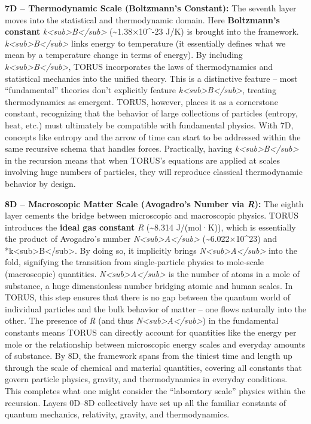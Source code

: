 \documentclass[
]{article}
\begin{document}
\textbf{7D -- Thermodynamic Scale (Boltzmann's Constant):} The seventh
layer moves into the statistical and thermodynamic domain. Here
\textbf{Boltzmann's constant}
\emph{k\textless sub\textgreater B\textless/sub\textgreater{}}
(\textasciitilde1.38×10\^{}-23 J/K) is brought into the framework.
\emph{k\textless sub\textgreater B\textless/sub\textgreater{}} links
energy to temperature (it essentially defines what we mean by a
temperature change in terms of energy). By including
\emph{k\textless sub\textgreater B\textless/sub\textgreater{}}, TORUS
incorporates the laws of thermodynamics and statistical mechanics into
the unified theory. This is a distinctive feature -- most
``fundamental'' theories don't explicitly feature
\emph{k\textless sub\textgreater B\textless/sub\textgreater{}}, treating
thermodynamics as emergent. TORUS, however, places it as a cornerstone
constant, recognizing that the behavior of large collections of
particles (entropy, heat, etc.) must ultimately be compatible with
fundamental physics. With 7D, concepts like entropy and the arrow of
time can start to be addressed within the same recursive schema that
handles forces. Practically, having
\emph{k\textless sub\textgreater B\textless/sub\textgreater{}} in the
recursion means that when TORUS's equations are applied at scales
involving huge numbers of particles, they will reproduce classical
thermodynamic behavior by design.

\textbf{8D -- Macroscopic Matter Scale (Avogadro's Number via
\emph{R}):} The eighth layer cements the bridge between microscopic and
macroscopic physics. TORUS introduces the \textbf{ideal gas constant}
\emph{R} (\textasciitilde8.314 J/(mol·K)), which is essentially the
product of Avogadro's number
\emph{N\textless sub\textgreater A\textless/sub\textgreater{}}
(\textasciitilde6.022×10\^{}23) and
*k\textless sub\textgreater B\textless/sub\textgreater. By doing so, it
implicitly brings
\emph{N\textless sub\textgreater A\textless/sub\textgreater{}} into the
fold, signifying the transition from single-particle physics to
mole-scale (macroscopic) quantities.
\emph{N\textless sub\textgreater A\textless/sub\textgreater{}} is the
number of atoms in a mole of substance, a huge dimensionless number
bridging atomic and human scales. In TORUS, this step ensures that there
is no gap between the quantum world of individual particles and the bulk
behavior of matter -- one flows naturally into the other. The presence
of \emph{R} (and thus
\emph{N\textless sub\textgreater A\textless/sub\textgreater{}}) in the
fundamental constants means TORUS can directly account for quantities
like the energy per mole or the relationship between microscopic energy
scales and everyday amounts of substance. By 8D, the framework spans
from the tiniest time and length up through the scale of chemical and
material quantities, covering all constants that govern particle
physics, gravity, and thermodynamics in everyday conditions. This
completes what one might consider the ``laboratory scale'' physics
within the recursion. Layers 0D--8D collectively have set up all the
familiar constants of quantum mechanics, relativity, gravity, and
thermodynamics.
\end{document}
